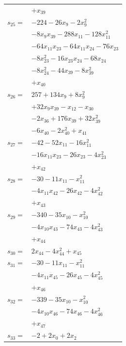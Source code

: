 \begin{longtable}{@{}r@{\;}l@{}}
 & \(\displaystyle +x_{39}\) \\[3pt]
\(s_{25}=\) & \(\displaystyle -224 -26x_{9} -2x_{9}^{2}\) \\
 & \(\displaystyle -8x_{9}x_{39} -288x_{11} -128x_{11}^{2}\) \\
 & \(\displaystyle -64x_{11}x_{23} -64x_{11}x_{24} -76x_{23}\) \\
 & \(\displaystyle -8x_{23}^{2} -16x_{23}x_{24} -68x_{24}\) \\
 & \(\displaystyle -8x_{24}^{2} -44x_{39} -8x_{39}^{2}\) \\
 & \(\displaystyle +x_{40}\) \\[3pt]
\(s_{26}=\) & \(\displaystyle 257 +134x_{9} +8x_{9}^{2}\) \\
 & \(\displaystyle +32x_{9}x_{39} -x_{12} -x_{30}\) \\
 & \(\displaystyle -2x_{36} +176x_{39} +32x_{39}^{2}\) \\
 & \(\displaystyle -6x_{40} -2x_{40}^{2} +x_{41}\) \\[3pt]
\(s_{27}=\) & \(\displaystyle -42 -52x_{11} -16x_{11}^{2}\) \\
 & \(\displaystyle -16x_{11}x_{23} -26x_{23} -4x_{23}^{2}\) \\
 & \(\displaystyle +x_{42}\) \\[3pt]
\(s_{28}=\) & \(\displaystyle -30 -11x_{11} -x_{11}^{2}\) \\
 & \(\displaystyle -4x_{11}x_{42} -26x_{42} -4x_{42}^{2}\) \\
 & \(\displaystyle +x_{43}\) \\[3pt]
\(s_{29}=\) & \(\displaystyle -340 -35x_{10} -x_{10}^{2}\) \\
 & \(\displaystyle -4x_{10}x_{43} -74x_{43} -4x_{43}^{2}\) \\
 & \(\displaystyle +x_{44}\) \\[3pt]
\(s_{30}=\) & \(\displaystyle 2x_{44} -4x_{44}^{2} +x_{45}\) \\[3pt]
\(s_{31}=\) & \(\displaystyle -30 -11x_{11} -x_{11}^{2}\) \\
 & \(\displaystyle -4x_{11}x_{45} -26x_{45} -4x_{45}^{2}\) \\
 & \(\displaystyle +x_{46}\) \\[3pt]
\(s_{32}=\) & \(\displaystyle -339 -35x_{10} -x_{10}^{2}\) \\
 & \(\displaystyle -4x_{10}x_{46} -74x_{46} -4x_{46}^{2}\) \\
 & \(\displaystyle +x_{47}\) \\[3pt]
\(s_{33}=\) & \(\displaystyle -2 +2x_{0} +2x_{2}\) \\

\end{longtable}
